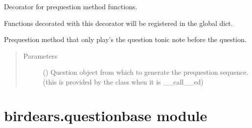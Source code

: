 \documentclass[letterpaper,10pt,english]{sphinxmanual}
\begin{document}

\begin{fulllineitems}
\label{\detokenize{index:birdears.prequestion.register_prequestion_method}}
\sphinxAtStartPar
Decorator for prequestion method functions.

\sphinxAtStartPar
Functions decorated with this decorator will be registered in the
 global dict.

\end{fulllineitems}


\begin{fulllineitems}
\label{\detokenize{index:birdears.prequestion.tonic_only}}
\sphinxAtStartPar
Pre\sphinxhyphen{}question method that only play’s the question tonic note before the
question.
\begin{quote}\begin{description}
\item[{Parameters}] \leavevmode
\sphinxAtStartPar
{} () \textendash{} Question object from which to generate the
pre\sphinxhyphen{}question sequence. (this is provided by the  class
when it is {\color{red}\bfseries{}\textasciigrave{}}\_\_call\_\_\textasciigrave{}ed)

\end{description}\end{quote}

\end{fulllineitems}



\section{birdears.questionbase module}
\label{\detokenize{index:module-birdears.questionbase}}\label{\detokenize{index:birdears-questionbase-module}}
\end{document}
